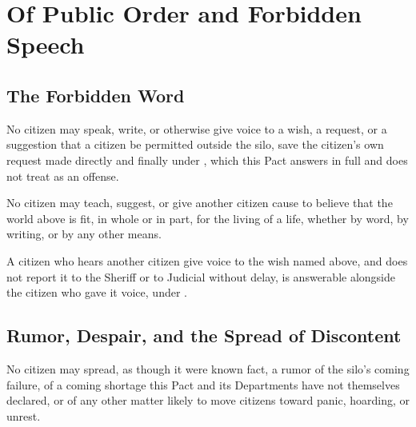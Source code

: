 \chapter{Of Public Order and Forbidden Speech}
\label{art:publicorder}


\section{The Forbidden Word}
\label{sec:publicorder:forbidden-word}

No citizen may speak, write, or otherwise give voice to a wish, a request, or a suggestion that a citizen be permitted outside the silo, save the citizen's own request made directly and finally under , which this Pact answers in full and does not treat as an offense.

\begin{clauses}
\item No citizen may teach, suggest, or give another citizen cause to believe that the world above is fit, in whole or in part, for the living of a life, whether by word, by writing, or by any other means.
\item A citizen who hears another citizen give voice to the wish named above, and does not report it to the Sheriff or to Judicial without delay, is answerable alongside the citizen who gave it voice, under .
\end{clauses}

\section{Rumor, Despair, and the Spread of Discontent}
\label{sec:publicorder:rumor-despair-and-the-spread-of-discontent}

No citizen may spread, as though it were known fact, a rumor of the silo's coming failure, of a coming shortage this Pact and its Departments have not themselves declared, or of any other matter likely to move citizens toward panic, hoarding, or unrest.

